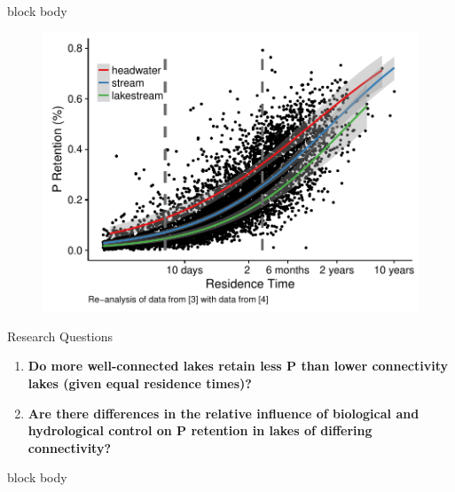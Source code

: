 \documentclass[final,hyperref={pdfpagelabels=false}]{beamer}
\begin{document}
\begin{frame}[t]
\begin{columns}[t]
\begin{column}{.465\textwidth}
{
\begin{beamercolorbox}[wd=\textwidth,rounded=true]{block body}
   \begin{figure}
      \includegraphics[width=\linewidth]{milstead_multi.pdf}
   \end{figure}
\end{beamercolorbox}
}

\vspace{1em}
\begin{block}{Research Questions}

\begin{enumerate} \large 
\item \textbf{Do more well-connected lakes retain less P than lower connectivity lakes (given equal residence times)?}
\vspace{1em}
\item \textbf{Are there differences in the relative influence of biological and hydrological control on P retention in lakes of differing connectivity?}
\end{enumerate}
\end{block}

{
\begin{beamercolorbox}[wd=\textwidth,rounded=true]{block body}


\end{beamercolorbox}}
\end{column}
\end{columns}
\end{frame}
\end{document}
